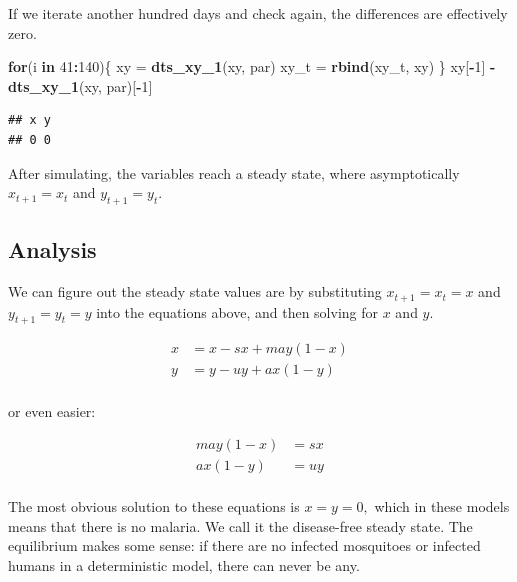 \documentclass[
]{book}
\newenvironment{Shaded}{\begin{snugshade}}{\end{snugshade}}
\newcommand{\ControlFlowTok}[1]{\textcolor[rgb]{0.13,0.29,0.53}{\textbf{#1}}}
\newcommand{\DecValTok}[1]{\textcolor[rgb]{0.00,0.00,0.81}{#1}}
\newcommand{\FunctionTok}[1]{\textcolor[rgb]{0.13,0.29,0.53}{\textbf{#1}}}
\newcommand{\NormalTok}[1]{#1}
\newcommand{\OtherTok}[1]{\textcolor[rgb]{0.56,0.35,0.01}{#1}}
\newcommand{\SpecialCharTok}[1]{\textcolor[rgb]{0.81,0.36,0.00}{\textbf{#1}}}
\begin{document}
If we iterate another hundred days and check again, the differences are effectively zero.

\begin{Shaded}
\begin{Highlighting}[]
\ControlFlowTok{for}\NormalTok{(i }\ControlFlowTok{in} \DecValTok{41}\SpecialCharTok{:}\DecValTok{140}\NormalTok{)\{}
\NormalTok{  xy }\OtherTok{=} \FunctionTok{dts\_xy\_1}\NormalTok{(xy, par)}
\NormalTok{  xy\_t }\OtherTok{=} \FunctionTok{rbind}\NormalTok{(xy\_t, xy) }
\NormalTok{\} }
\NormalTok{xy[}\SpecialCharTok{{-}}\DecValTok{1}\NormalTok{] }\SpecialCharTok{{-}} \FunctionTok{dts\_xy\_1}\NormalTok{(xy, par)[}\SpecialCharTok{{-}}\DecValTok{1}\NormalTok{]}
\end{Highlighting}
\end{Shaded}

\begin{verbatim}
## x y 
## 0 0
\end{verbatim}

After simulating, the variables reach a steady state, where asymptotically \(x_{t+1} = x_t\) and \(y_{t+1} = y_t\).

\subsection{Analysis}\label{analysis}

We can figure out the steady state values are by substituting \(x_{t+1} = x_t = x\) and \(y_{t+1} = y_t = y\) into the equations above, and then solving for \(x\) and \(y\).

\[
\begin{array}{rl}
x &=  x - s x + m a y (1-x)  \\ 
y &=  y - u y + a x (1-y) \\ 
\end{array}
\]

or even easier:

\[\begin{array}{rl}
m a y (1-x) &=  s x \\ 
a x (1 - y) &=  u y\\ 
\end{array}\]

The most obvious solution to these equations is \(x=y=0,\) which in these models means that there is no malaria. We call it the disease-free steady state. The equilibrium makes some sense: if there are no infected mosquitoes or infected humans in a deterministic model, there can never be any.
\end{document}
